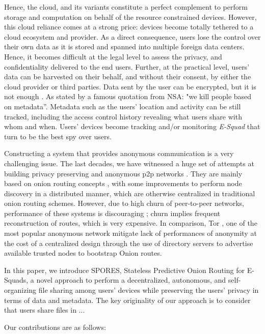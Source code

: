 Hence, the cloud, and its variants constitute a perfect complement
to perform storage and computation on behalf of the resource
constrained devices. However, this cloud reliance comes at a strong price:
devices become totally tethered to a cloud ecosystem and provider. As
a direct consequence, users lose the control over their own data as it is
stored and spanned into multiple foreign data centers. Hence, it becomes difficult at 
the legal level to assess the privacy, and
confidentiality delivered to the end users. Further, at the practical
level, users' data can be harvested on their behalf, and without their
consent, by either the cloud provider or third parties.
Data sent by the user can be encrypted, but it is not enough
\cite{granick_2017, HooffLZZ15, HarnikPS10}.  As stated by a famous quotation from
NSA: "we kill people based on metadata''. Metadata such as the users'
location and activity can be still tracked, including the access
control history revealing what users share with whom and when.
Users’ devices become tracking and/or monitoring \textit{E-Squad} that turn to
be the best spy over users. 

Constructing a system that provides anonymous communication is a very
challenging issue. The last decades, we have witnessed a
 huge set of attempts at building privacy preserving and anonymous p2p
 networks \cite{Clarke:2001, Gnunet2002, Freedman:2002, Nambiar:2006,
   Rennhard:2002}. They are mainly based on onion
 routing concepts \cite{Chaum:1981}, with some improvements to perform node
 discovery in a distributed manner, which are otherwise
centralized in traditional onion routing schemes. However, due to high
churn of peer-to-peer networks, performance of these systems is
discouraging \cite{LeBlond:2013}; churn implies frequent
reconstruction of routes, which is very expensive. In comparison, Tor
\cite{Dingledine:2004}, one of the most popular anonymous network
mitigate lack of performances of anonymity at the cost of a
centralized design through the use of directory
servers to advertise available trusted nodes to bootstrap Onion
routes. 

In this paper, we introduce SPORES, Stateless Predictive Onion Routing
for E-Squads, a novel approach to perform a decentralized, autonomous, and self-organizing 
file sharing among users' devices while preserving the users’ privacy
in terms of data and metadata. The key originality of our approach is
to consider that users share files in ...



Our contributions are as follows:





